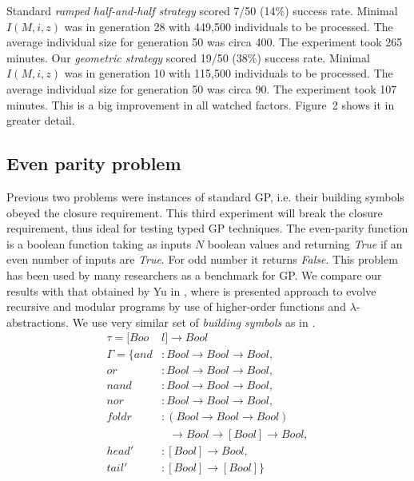 \documentclass[conference]{IEEEtran}
\newcommand{\ar}{\rightarrow\xspace}
\begin{document}
Standard \textit{ramped half-and-half strategy} scored 7/50 (14\%) success rate. 
Minimal $I(M,i,z)$ was in generation 28 with 449,500 individuals to be processed.
The average individual size for generation 50 was circa 400.
The experiment took 265 minutes.
Our \textit{geometric strategy} scored 19/50 (38\%) success rate. 
Minimal $I(M,i,z)$ was in generation 10 with 115,500 individuals to be processed.
The average individual size for generation 50 was circa 90.
The experiment took 107 minutes.
This is a big improvement in all watched factors.
Figure~2 shows it in greater detail.

\subsection{Even parity problem}

Previous two problems were instances of standard GP, i.e. their building symbols
obeyed the closure requirement. This third experiment will break the closure requirement, thus ideal for testing typed GP techniques. 
The even-parity function is a boolean function taking as inputs $N$
boolean values and returning \textit{True} if an even number of inputs 
are \textit{True}. For odd number it returns \textit{False}.
This problem has been used by many researchers
as a benchmark for GP. We compare our results with that obtained by Yu in \cite{yu01},
where is presented approach to evolve recursive and modular programs
by use of higher-order functions and $\lambda$-abstractions.
We use very similar set of \textit{building symbols} as in \cite{yu01}. 
\begin{align*}
\tau = [Boo&l] \ar Bool\\
\Gamma = \{
  and   &: Bool \ar Bool \ar Bool                              ,\\
  or    &: Bool \ar Bool \ar Bool                              ,\\
  nand  &: Bool \ar Bool \ar Bool                              ,\\
  nor   &: Bool \ar Bool \ar Bool                              ,\\
  foldr &: (Bool \ar Bool \ar Bool) \\
        &~~~\ar Bool \ar [Bool] \ar Bool ,\\
  head' &: [Bool] \ar Bool                                   ,\\
  tail' &: [Bool] \ar [Bool]                              \}
\end{align*}
\end{document}
